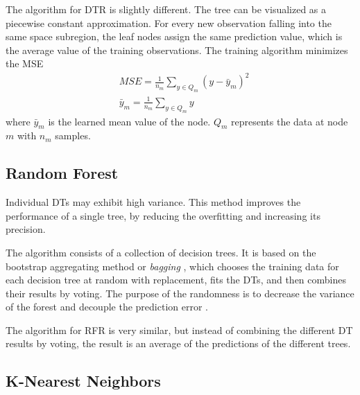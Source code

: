 
The algorithm for \gls*{DTR} is slightly different.
The tree can be visualized as a piecewise constant approximation.
For every new observation falling into the same space subregion, the leaf nodes assign the same prediction value, which is the average value of the training observations.
The training algorithm minimizes the \gls*{MSE} \cite{pedregosa_scikit-learn_2011}
\begin{align}
& MSE = \frac{1}{n_m} \sum_{y \in Q_m} \left( y - \bar{y}_m \right)^2 \label{eq-dtr} \\
& \bar{y}_m = \frac{1}{n_m} \sum_{y \in Q_m} y
\end{align}
where $\bar{y}_m$ is the learned mean value of the node.
$Q_m$ represents the data at node $m$ with $n_m$ samples.


\subsection{Random Forest}


Individual DTs may exhibit high variance.
This method improves the performance of a single tree, by reducing the overfitting and increasing its precision.

The algorithm consists of a collection of decision trees.
It is based on the bootstrap aggregating method or \textit{bagging} \cite{breiman_bagging_1996}, which chooses the training data for each decision tree at random with replacement, fits the \glspl*{DT}, and then combines their results by voting.
The purpose of the randomness is to decrease the variance of the forest and decouple the prediction error \cite{pedregosa_scikit-learn_2011}.

The algorithm for \gls*{RFR} is very similar, but instead of combining the different DT results by voting, the result is an average of the predictions of the different trees.


\subsection{K-Nearest Neighbors}

